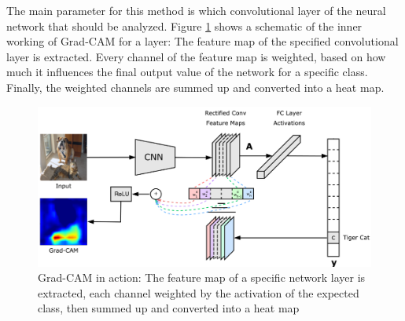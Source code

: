 The main parameter for this method is which convolutional layer of the neural network that should be analyzed. Figure \ref{grad_cam_explanation} shows a schematic of the inner working of Grad-CAM for a layer: The feature map of the specified convolutional layer is extracted. Every channel of the feature map is weighted, based on how much it influences the final output value of the network for a specific class. Finally, the weighted channels are summed up and converted into a heat map.

\begin{figure}[H]
\centering
\includegraphics[width=12cm]{chapters/02_methods/images/grad-cam.png}
\caption{Grad-CAM in action: The feature map of a specific network layer is extracted, each channel weighted by the activation of the expected class, then summed up and converted into a heat map}
\label{grad_cam_explanation}
\end{figure}

